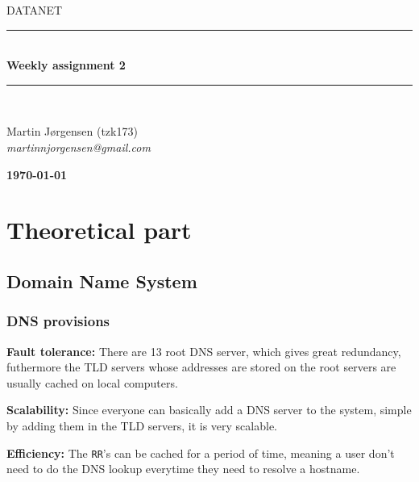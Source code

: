 \documentclass[10pt]{article}
\newcommand{\HRule}{\rule{\linewidth}{0.5mm}}
\begin{document}
\begin{titlepage}

\begin{center}

\textsc{\LARGE DATANET}\\[1.5cm]


\HRule \\[0.4cm]

{ \bfseries Weekly assignment 2}\\[1cm]

\HRule \\ [7.5cm]

\begin{minipage}{0.5\textwidth}
\begin{flushleft} \large
Martin Jørgensen (tzk173)\\
\textit{martinnjorgensen@gmail.com}\\
\end{flushleft}
\end{minipage}
\begin{minipage}{0.4\textwidth}
\begin{flushright} \large
\textbf{\today} \\
\end{flushright}
\end{minipage}

\vfill



\end{center}

\end{titlepage}
\clearpage

\section{Theoretical part}
\subsection{Domain Name System}
\subsubsection{DNS provisions}
\begin{enumerate*}
  \item \textbf{Fault tolerance:} There are 13 root DNS server, which gives
        great redundancy, futhermore the TLD servers whose addresses are stored
        on the root servers are usually cached on local computers.
  \item \textbf{Scalability:} Since everyone can basically add a DNS server to
        the system, simple by adding them in the TLD servers, it is very
        scalable.
  \item \textbf{Efficiency:} The \texttt{RR}'s can be cached for a period of
        time, meaning a user don't need to do the DNS lookup everytime they need
        to resolve a hostname.
\end{enumerate*}
\end{document}
